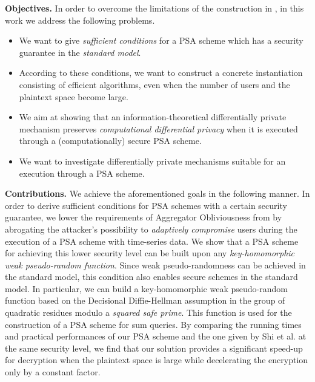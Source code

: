 \documentclass[10pt]{extarticle}
\begin{document}
\noindent\textbf{Objectives.} In order to overcome the limitations of the construction in \cite{2}, in this work we address the following problems.
\begin{itemize}
 \item We want to give \textit{sufficient conditions} for a PSA scheme which has a security guarantee in the \textit{standard model}.
 \item According to these conditions, we want to construct a concrete instantiation consisting of efficient algorithms, even when the number of users and the plaintext space become large.
 \item We aim at showing that an information-theoretical differentially private mechanism preserves \textit{computational differential privacy} when it is executed through a (computationally) secure PSA scheme. \item We want to investigate differentially private mechanisms suitable for an execution through a PSA scheme.
\end{itemize}


\noindent\textbf{Contributions.} We achieve the aforementioned goals in the following manner. In order to derive sufficient conditions for PSA schemes with a certain security guarantee, we lower the requirements of Aggregator Obliviousness from \cite{2} by abrogating the attacker's possibility to \textit{adaptively compromise} users during the execution of a PSA scheme with time-series data. We show that a PSA scheme for achieving this lower security level can be built upon any \textit{key-homomorphic weak pseudo-random function}. Since weak pseudo-randomness can be achieved in the standard model, this condition also enables secure schemes in the standard model. In particular, we can build a key-homomorphic weak pseudo-random function based on the Decisional Diffie-Hell\-man assumption in the group of quadratic residues modulo a \textit{squared safe prime}. This function is used for the construction of a PSA scheme for sum queries. By comparing the running times and practical performances of our PSA scheme and the one given by Shi et al. \cite{2} at the same security level, we find that our solution provides a significant speed-up for decryption when the plaintext space is large while decelerating the encryption only by a constant factor. 
\end{document}
